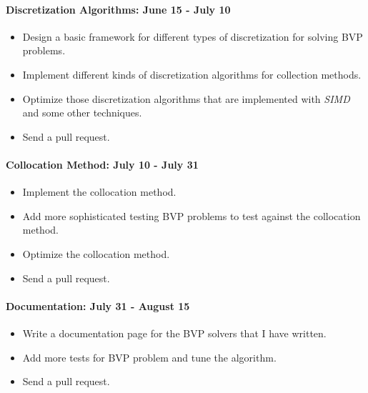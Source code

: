 \documentclass[a4paper,11pt,onecolumn]{article}
\begin{document}
\paragraph{Discretization Algorithms: June 15 - July 10} %
\label{par:discretization_algorithms}
\begin{itemize}
	\item Design a basic framework for different types of discretization for solving
	BVP problems.
	\item Implement different kinds of discretization algorithms for collection methods.
	\item Optimize those discretization algorithms that are implemented with \textit{SIMD}
	and some other techniques.
	\item Send a pull request.
\end{itemize}

\paragraph{Collocation Method: July 10 - July 31} %
\label{par:least_squares_method_july_10_july_31}
\begin{itemize}
	\item Implement the collocation method.
	\item Add more sophisticated testing BVP problems to test against the collocation method.
	\item Optimize the collocation method.
	\item Send a pull request.
\end{itemize}

\paragraph{Documentation: July 31 - August 15} %
\label{par:weighted_residual_method_july_31_august_15}
\begin{itemize}
	\item Write a documentation page for the BVP solvers that I have written.
	\item Add more tests for BVP problem and tune the algorithm.
	\item Send a pull request.
\end{itemize}
\end{document}
